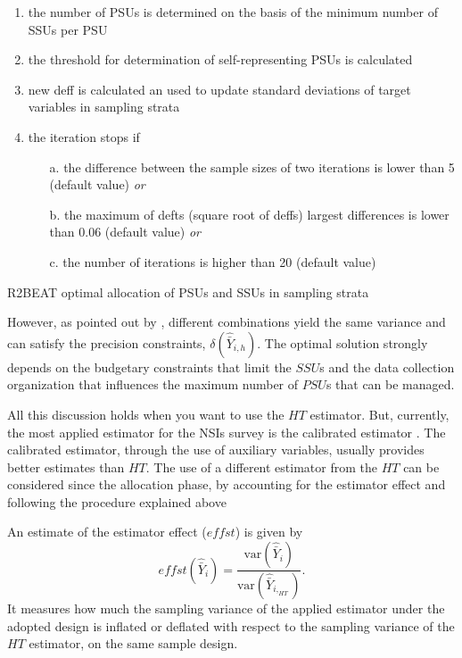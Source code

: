 \begin{algorithm}[h!]
{\begin{enumerate}
			\item the number of PSUs is determined on the basis of the minimum number of SSUs per PSU\;
			\item the threshold for determination of self-representing PSUs is calculated\;
			\item new deff is calculated an used to update standard deviations of target variables in sampling strata\;
			\item the iteration stops if \
			\begin{itemize}
				\item[a.] the difference between the 
				sample sizes of two iterations is lower than 5 (default value) \textit{or}
				\item[b.] the maximum of defts (square 
				root of deffs) largest differences is lower than 0.06 (default value) \textit{or}
				\item[c.] the number of iterations is 
				higher than 20 (default value)\;
			\end{itemize}
		\end{enumerate}
	}
	\caption{R2BEAT optimal allocation of PSUs and SSUs in sampling strata}
	\label{algorithm}
\end{algorithm}

However, as pointed out by \cite{waters1987optimal}, different combinations yield the same variance and can satisfy the precision constraints, $\delta \left( \hat{\bar{Y}}_{i,h} \right)$.
The optimal solution strongly depends on the budgetary constraints that limit the $SSU$s and the data collection organization that influences the maximum number of $PSU$s that can be managed.

All this discussion holds when you want to use the $HT$ estimator.   
But, currently, the most applied estimator for the NSIs survey is the calibrated estimator \citep{deville1992calibration}.
The calibrated estimator, through the use of auxiliary variables, usually provides better estimates than $HT$.
The use of a different estimator from the $HT$ can be considered since the allocation phase, by accounting for the estimator effect and following the procedure explained above

An estimate of the estimator effect ($effst$) is given by 
\begin{equation}
	\label{effst}
	effst (\hat{\bar{Y}}_{i}) = \frac{\text{var} \left(\hat{\bar{Y}}_{i} \right)}{\text{var} \left(\hat{\bar{Y}}_{i,_{HT}} \right)}.
\end{equation}
It measures how much the sampling variance of the applied estimator under the adopted design is inflated or deflated with respect to the sampling variance of the $HT$ estimator, on the same sample design.


